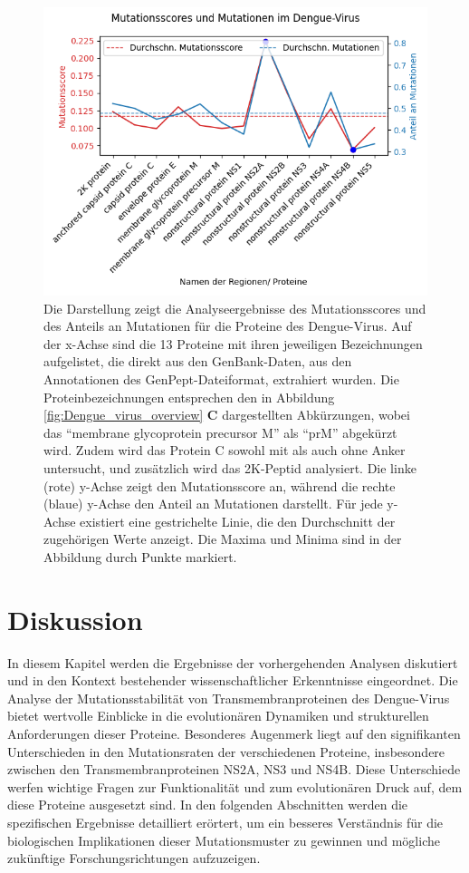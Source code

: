 \documentclass[german,version-2022-01]{uzl-thesis}
\begin{document}
\begin{figure}[tbp]
  \centering
  \includegraphics[scale=0.65]{Images/Diagramm_Scores_und_Mutationen_Dengue_viren_Namen.png}
  \caption{Die Darstellung zeigt die Analyseergebnisse des Mutationsscores und des Anteils an Mutationen f\"ur die Proteine des Dengue-Virus. Auf der x-Achse sind die 13 Proteine mit ihren jeweiligen Bezeichnungen aufgelistet, die direkt aus den GenBank-Daten, aus den Annotationen des GenPept-Dateiformat, extrahiert wurden. Die Proteinbezeichnungen entsprechen den in Abbildung \ref{fig:Dengue_virus_overview} \textbf{C} dargestellten Abk\"urzungen, wobei das "`membrane glycoprotein precursor M"' als "`prM"' abgek\"urzt wird. Zudem wird das Protein C sowohl mit als auch ohne Anker untersucht, und zus\"atzlich wird das 2K-Peptid analysiert. Die linke (rote) y-Achse zeigt den Mutationsscore an, w\"ahrend die rechte (blaue) y-Achse den Anteil an Mutationen darstellt. F\"ur jede y-Achse existiert eine gestrichelte Linie, die den Durchschnitt der zugeh\"origen Werte anzeigt. Die Maxima und Minima sind in der Abbildung durch Punkte markiert.}
  \label{fig:Dengue_virus_scores_and_mutations_namen}
\end{figure}


\chapter{Diskussion}
In diesem Kapitel werden die Ergebnisse der vorhergehenden Analysen diskutiert und in den Kontext bestehender wissenschaftlicher Erkenntnisse eingeordnet. Die Analyse der Mutationsstabilit\"at von Transmembranproteinen des Dengue-Virus bietet wertvolle Einblicke in die evolution\"aren Dynamiken und strukturellen Anforderungen dieser Proteine. Besonderes Augenmerk liegt auf den signifikanten Unterschieden in den Mutationsraten der verschiedenen Proteine, insbesondere zwischen den Transmembranproteinen NS2A, NS3 und NS4B. Diese Unterschiede werfen wichtige Fragen zur Funktionalit\"at und zum evolution\"aren Druck auf, dem diese Proteine ausgesetzt sind. In den folgenden Abschnitten werden die spezifischen Ergebnisse detailliert er\"ortert, um ein besseres Verst\"andnis f\"ur die biologischen Implikationen dieser Mutationsmuster zu gewinnen und m\"ogliche zuk\"unftige Forschungsrichtungen aufzuzeigen.
\end{document}
